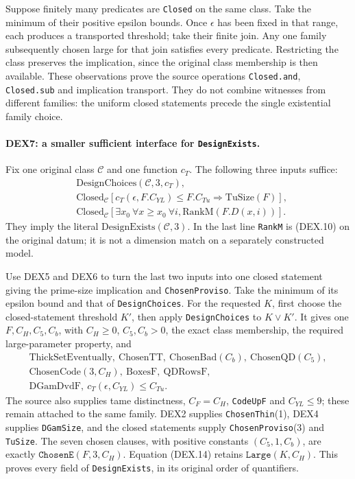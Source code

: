 Suppose finitely many predicates are \texttt{Closed} on the same
class. Take the minimum of their positive epsilon bounds. Once
$\epsilon$ has been fixed in that range, each produces a transported
threshold; take their finite join. Any one family subsequently chosen
large for that join satisfies every predicate. Restricting the class
preserves the implication, since the original class membership is
then available. These observations prove the source operations
\texttt{Closed.and}, \texttt{Closed.sub} and implication transport.
They do not combine witnesses from different families: the uniform
closed statements precede the single existential family choice.

\paragraph{DEX7: a smaller sufficient interface for \texttt{DesignExists}.}
\label{claim:DEX7}
Fix one original class $\mathcal C$ and one function $c_T$.
The following three inputs suffice:
\[
\begin{split}
 &\mathrm{DesignChoices}(\mathcal C,3,c_T),\\
 &\mathrm{Closed}_{\mathcal C}
    [c_T(\epsilon,F.C_{YL})\le F.C_{Tu}\Rightarrow\mathrm{TuSize}(F)],\\
 &\mathrm{Closed}_{\mathcal C}
    [\exists x_0\ \forall x\ge x_0\ \forall i,
                                   \mathrm{RankM}(F.D(x,i))].
\end{split}
                                                               \tag{DEX.15}
\]
They imply the literal $\mathrm{DesignExists}(\mathcal C,3)$.
In the last line \texttt{RankM} is (DEX.10) on the original datum;
it is not a dimension match on a separately constructed model.

Use DEX5 and DEX6 to turn the last two inputs into one closed statement
giving the prime-size implication and \texttt{ChosenProviso}.
Take the minimum of its epsilon bound and that of
\texttt{DesignChoices}. For the requested $K$, first choose the
closed-statement threshold $K'$, then apply \texttt{DesignChoices}
to $K\vee K'$. It gives one $F,C_H,C_5,C_b$, with $C_H\ge0$,
$C_5,C_b>0$, the exact class membership, the required large-parameter
property, and
\[
 \begin{gathered}
 \mathrm{ThickSetEventually},\ \mathrm{ChosenTT},\
 \mathrm{ChosenBad}(C_b),\ \mathrm{ChosenQD}(C_5),\\
 \mathrm{ChosenCode}(3,C_H),\ \mathrm{BoxesF},\ \mathrm{QDRowsF},\\
 \mathrm{DGamDvdF},\ c_T(\epsilon,C_{YL})\le C_{Tu}.
 \end{gathered}
\]
The source also supplies tame distinctness, $C_F=C_H$,
\texttt{CodeUpF} and $C_{YL}\le9$; these remain attached to the same
family. DEX2 supplies \texttt{ChosenThin}(1), DEX4 supplies
\texttt{DGamSize}, and the closed statements supply
\texttt{ChosenProviso}(3) and \texttt{TuSize}.
The seven chosen clauses, with positive constants $(C_5,1,C_b)$,
are exactly $\texttt{ChosenE}(F,3,C_H)$. Equation (DEX.14) retains
$\texttt{Large}(K,C_H)$. This proves every field of
\texttt{DesignExists}, in its original order of quantifiers.

